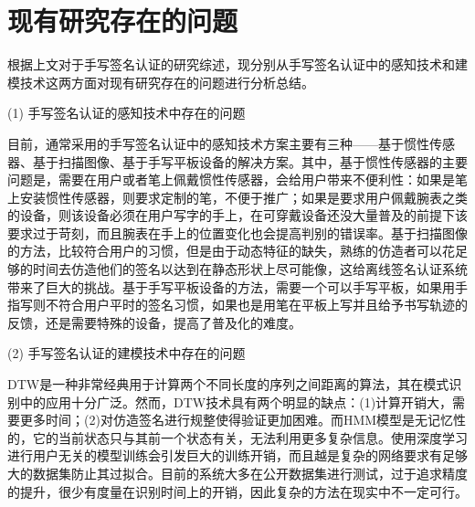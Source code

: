 \section{现有研究存在的问题}
根据上文对于手写签名认证的研究综述，现分别从手写签名认证中的感知技术和建模技术这两方面对现有研究存在的问题进行分析总结。

(1) 手写签名认证的感知技术中存在的问题

目前，通常采用的手写签名认证中的感知技术方案主要有三种——基于惯性传感器、基于扫描图像、基于手写平板设备的解决方案。其中，基于惯性传感器的主要问题是，需要在用户或者笔上佩戴惯性传感器，会给用户带来不便利性：如果是笔上安装惯性传感器，则要求定制的笔，不便于推广；如果是要求用户佩戴腕表之类的设备，则该设备必须在用户写字的手上，在可穿戴设备还没大量普及的前提下该要求过于苛刻，而且腕表在手上的位置变化也会提高判别的错误率。基于扫描图像的方法，比较符合用户的习惯，但是由于动态特征的缺失，熟练的仿造者可以花足够的时间去仿造他们的签名以达到在静态形状上尽可能像，这给离线签名认证系统带来了巨大的挑战。基于手写平板设备的方法，需要一个可以手写平板，如果用手指写则不符合用户平时的签名习惯，如果也是用笔在平板上写并且给予书写轨迹的反馈，还是需要特殊的设备，提高了普及化的难度。

(2) 手写签名认证的建模技术中存在的问题

DTW是一种非常经典用于计算两个不同长度的序列之间距离的算法，其在模式识别中的应用十分广泛。然而，DTW技术具有两个明显的缺点：(1)计算开销大，需要更多时间；(2)对仿造签名进行规整使得验证更加困难。而HMM模型是无记忆性的，它的当前状态只与其前一个状态有关，无法利用更多复杂信息。使用深度学习进行用户无关的模型训练会引发巨大的训练开销，而且越是复杂的网络要求有足够大的数据集防止其过拟合。目前的系统大多在公开数据集进行测试，过于追求精度的提升，很少有度量在识别时间上的开销，因此复杂的方法在现实中不一定可行。

